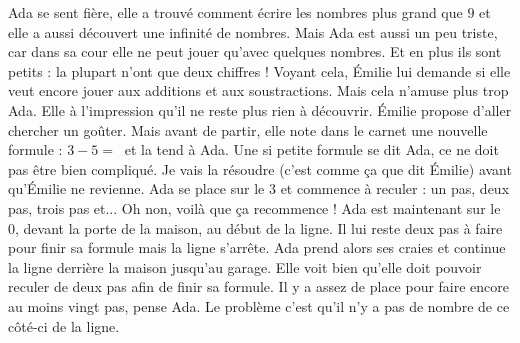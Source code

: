 Ada se sent fière, elle a trouvé comment écrire les nombres plus grand que $9$ et elle a aussi découvert une infinité de nombres. 
Mais Ada est aussi un peu triste, car dans sa cour elle ne peut jouer qu’avec quelques nombres. Et en plus ils sont petits : la plupart n’ont que deux chiffres !
Voyant cela, Émilie lui demande si elle veut encore jouer aux additions et aux soustractions. 
Mais cela n’amuse plus trop Ada. Elle à l’impression qu’il ne reste plus rien à découvrir. 
Émilie propose d’aller chercher un goûter. Mais avant de partir, elle note dans le carnet une nouvelle formule : $3 - 5 = ~$ et la tend à Ada. 
Une si petite formule se dit Ada, ce ne doit pas être bien compliqué. 
Je vais la résoudre (c’est comme ça que dit Émilie) avant qu’Émilie ne revienne. 
Ada se place sur le $3$ et commence à reculer : un pas, deux pas, trois pas et... 
Oh non, voilà que ça recommence ! Ada est maintenant sur le $0$, devant la porte de la maison, au début de la ligne. 
Il lui reste deux pas à faire pour finir sa formule mais la ligne s’arrête. 
Ada prend alors ses craies et continue la ligne derrière la maison jusqu’au garage. 
Elle voit bien qu’elle doit pouvoir reculer de deux pas afin de finir sa formule. 
Il y a assez de place pour faire encore au moins vingt pas, pense Ada. 
Le problème c’est qu’il n’y a pas de nombre de ce côté-ci de la ligne. 

